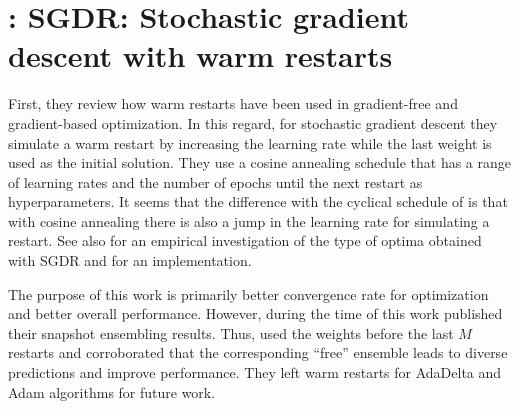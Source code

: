 \section{\textcite{loshchilov2016sgdr}: SGDR: Stochastic gradient descent with warm restarts}
First, they review how warm restarts have been used in gradient-free and gradient-based optimization. 
In this regard, for stochastic gradient descent they simulate a warm restart by increasing the learning rate while the last weight is used as the initial solution.
They use a cosine annealing schedule that has a range of learning rates and the number of epochs until the next restart as hyperparameters.
It seems that the difference with the cyclical schedule of \textcite{smith2017cyclical} is that with cosine annealing there is also a jump in the learning rate for simulating a restart.
See also \textcite{gotmare2018using} for an empirical investigation of the type of optima obtained with SGDR and \textcite{brownlee2019snapshot} for an implementation.

The purpose of this work is primarily better convergence rate for optimization and better overall performance. 
However, during the time of this work \textcite{huang2017snapshot} published their snapshot ensembling results.
Thus, \textcite{loshchilov2016sgdr} used the weights before the last $M$ restarts and corroborated that the corresponding ``free'' ensemble leads to diverse predictions and improve performance.
They left warm restarts for AdaDelta and Adam algorithms for future work.

